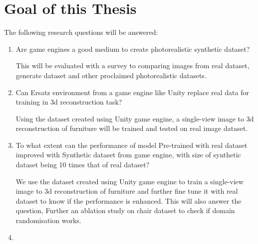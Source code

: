 \section{Goal of this Thesis}\label{sec:goal}

The following research questions will be answered:
\begin{enumerate}
    \item Are game engines a good medium to create photorealistic synthetic dataset?

    This will be evaluated with a survey to comparing images from real dataset, generate dataset and other proclaimed photorealistic datasets.
    \item Can Ersatz environment from a game engine like Unity replace real data for training in 3d reconstruction task?

    Using the dataset created using Unity game engine, a single-view image to 3d reconstruction of furniture will be trained and tested on real image dataset.

    \item To what extent can the performance of model Pre-trained with real dataset improved with Synthetic dataset from game engine,
            with size of synthetic dataset being 10 times that of real dataset?

    We use the dataset created using Unity game engine to train a single-view image to 3d reconstruction of furniture and further fine tune it with real dataset to know if the performance is enhanced.
    This will also answer the question, 
    Further an ablation study on chair dataset to check if domain randomisation works.

    \item {}
\end{enumerate}

